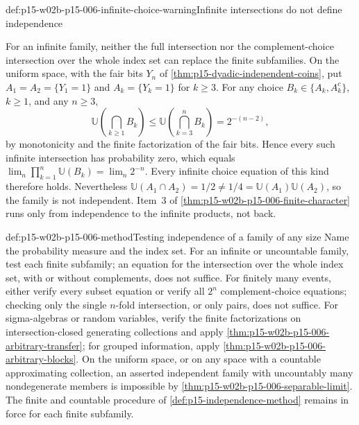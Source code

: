 \begin{hbwarning}{def:p15-w02b-p15-006-infinite-choice-warning}{Infinite intersections do not define independence}
\par\nobreak
For an infinite family, neither the full intersection nor the
complement-choice intersection over the whole index set can replace the
finite subfamilies. On the uniform space, with the fair bits \(Y_n\)
of \cref{thm:p15-dyadic-independent-coins}, put
\(A_1=A_2=\{Y_1=1\}\) and \(A_k=\{Y_k=1\}\) for \(k\geq3\). For any
choice \(B_k\in\{A_k,A_k^c\}\), \(k\geq1\), and any \(n\geq3\),
\[
 \mathbb U\left(\bigcap_{k\geq1}B_k\right)
   \leq\mathbb U\left(\bigcap_{k=3}^nB_k\right)=2^{-(n-2)},
\]
by monotonicity and the finite factorization of the fair bits. Hence
every such infinite intersection has probability zero, which equals
\(\lim_n\prod_{k=1}^n\mathbb U(B_k)=\lim_n2^{-n}\). Every infinite
choice equation of this kind therefore holds. Nevertheless
\(\mathbb U(A_1\cap A_2)=1/2\neq1/4=\mathbb U(A_1)\mathbb U(A_2)\),
so the family is not independent. Item~3 of
\cref{thm:p15-w02b-p15-006-finite-character} runs only from independence
to the infinite products, not back.
\end{hbwarning}

\begin{hbmethod}{def:p15-w02b-p15-006-method}{Testing independence of a family of any size}
Name the probability measure and the index set. For an infinite or
uncountable family, test each finite subfamily; an equation for the
intersection over the whole index set, with or without complements,
does not suffice. For finitely many events, either verify every subset
equation or verify all \(2^n\) complement-choice equations; checking
only the single \(n\)-fold intersection, or only pairs, does not
suffice. For sigma-algebras or random variables, verify the finite
factorizations on intersection-closed generating collections and apply
\cref{thm:p15-w02b-p15-006-arbitrary-transfer}; for grouped
information, apply \cref{thm:p15-w02b-p15-006-arbitrary-blocks}.
On the uniform space, or on any space with a countable approximating
collection, an asserted independent family with uncountably many
nondegenerate members is impossible by
\cref{thm:p15-w02b-p15-006-separable-limit}. The finite and countable
procedure of \cref{def:p15-independence-method} remains in force for
each finite subfamily.
\end{hbmethod}

